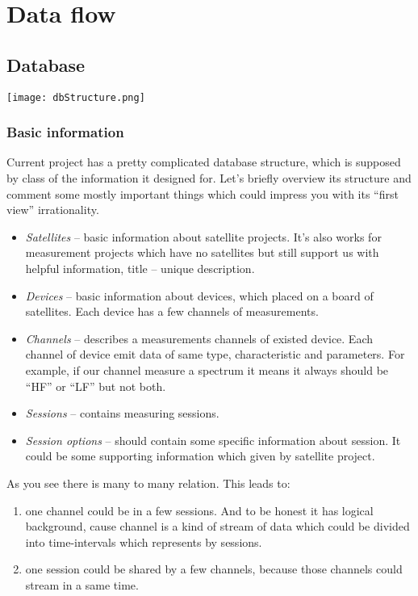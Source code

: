 \documentclass{article}
\begin{document}
    \section{Data flow}
    \subsection{Database}
    \texttt{[image: dbStructure.png]}
    \subsubsection{Basic information}

    Current project has a pretty complicated database structure, which is supposed by class of the information it designed for. Let's briefly overview its structure and comment some mostly important things which could impress you with its ``first view'' irrationality.

    \begin{itemize}            
        \item \textit{Satellites} -- basic information about satellite projects. It's also works for measurement projects which have no satellites but still support us with helpful information, title -- unique description.
        \item \textit{Devices} -- basic information about devices, which placed on a board of satellites. Each device has a few channels of measurements.    
        \item \textit{Channels} -- describes a measurements channels of existed device. Each channel of device emit data of same type, characteristic and parameters. For example, if our channel measure a spectrum it means it always should be ``HF'' or ``LF'' but not both. 
        \item \textit{Sessions} -- contains measuring sessions. 
        \item \textit{Session options} -- should contain some specific information about session. It could be some supporting information which given by satellite project.
    \end{itemize}

    As you see there is many to many relation. This leads to:
    \begin{enumerate}
        \item one channel could be in a few sessions. And to be honest it has logical background, cause channel is a kind of stream of data which could be divided into time-intervals which represents by sessions.
        \item one session could be shared by a few channels, because those channels could stream in a same time.
    \end{enumerate}
\end{document}
